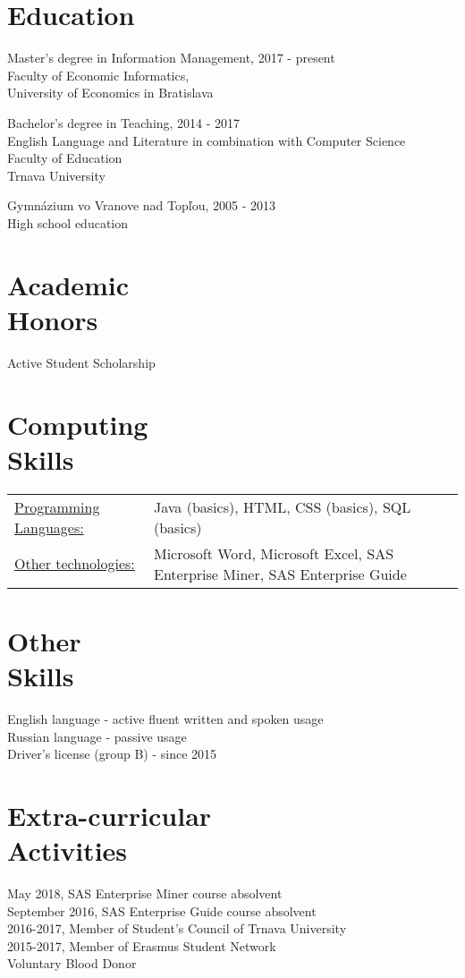 \documentclass[margin]{res}
\begin{document}
\begin{resume}
\section{Education}
Master's degree in Information Management, \hfill 2017 - present \\
Faculty of Economic Informatics, \\
University of Economics in Bratislava

Bachelor's degree in Teaching, \hfill 2014 - 2017 \\
English Language and Literature in combination with Computer Science \\
Faculty of Education \\
Trnava University

Gymn\'{a}zium vo Vranove nad Top\v{l}ou, \hfill 2005 - 2013 \\
High school education

\section{Academic \\ Honors}
Active Student Scholarship

\section{Computing \\ Skills}
   \begin{tabular}{l p{3in}}
       \underline{Programming Languages:} & Java (basics), HTML, CSS (basics), SQL (basics) \\
       \underline{Other technologies:} & Microsoft Word, Microsoft Excel, SAS Enterprise Miner, SAS Enterprise Guide
 \end{tabular}

\section{Other \\ Skills}
English language - active fluent written and spoken usage \\
Russian language - passive usage \\
Driver's license (group B) - since 2015

\section{Extra-curricular \\ Activities}
May 2018, SAS Enterprise Miner course absolvent \\
September 2016, SAS Enterprise Guide course absolvent \\
2016-2017, Member of Student's Council of Trnava University \\
2015-2017, Member of Erasmus Student Network \\
Voluntary Blood Donor
\end{resume}
\end{document}
